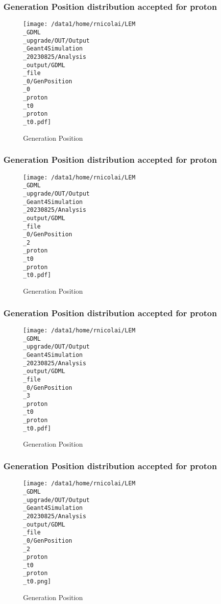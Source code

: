 \documentclass[8pt]{beamer}
\begin{document}
            \begin{frame}
                \frametitle{Generation Position distribution accepted for proton}
            
        \begin{figure}[h]
            \centering
            \texttt{[image: /data1/home/rnicolai/LEM\\\_GDML\\\_upgrade/OUT/Output\\\_Geant4Simulation\\\_20230825/Analysis\\\_output/GDML\\\_file\\\_0/GenPosition\\\_0\\\_proton\\\_t0\\\_proton\\\_t0.pdf]}
            \caption{Generation Position}
        \end{figure}
        
            \end{frame}
            
            \begin{frame}
                \frametitle{Generation Position distribution accepted for proton}
            
        \begin{figure}[h]
            \centering
            \texttt{[image: /data1/home/rnicolai/LEM\\\_GDML\\\_upgrade/OUT/Output\\\_Geant4Simulation\\\_20230825/Analysis\\\_output/GDML\\\_file\\\_0/GenPosition\\\_2\\\_proton\\\_t0\\\_proton\\\_t0.pdf]}
            \caption{Generation Position}
        \end{figure}
        
            \end{frame}
            
            \begin{frame}
                \frametitle{Generation Position distribution accepted for proton}
            
        \begin{figure}[h]
            \centering
            \texttt{[image: /data1/home/rnicolai/LEM\\\_GDML\\\_upgrade/OUT/Output\\\_Geant4Simulation\\\_20230825/Analysis\\\_output/GDML\\\_file\\\_0/GenPosition\\\_3\\\_proton\\\_t0\\\_proton\\\_t0.pdf]}
            \caption{Generation Position}
        \end{figure}
        
            \end{frame}
            
            \begin{frame}
                \frametitle{Generation Position distribution accepted for proton}
            
        \begin{figure}[h]
            \centering
            \texttt{[image: /data1/home/rnicolai/LEM\\\_GDML\\\_upgrade/OUT/Output\\\_Geant4Simulation\\\_20230825/Analysis\\\_output/GDML\\\_file\\\_0/GenPosition\\\_2\\\_proton\\\_t0\\\_proton\\\_t0.png]}
            \caption{Generation Position}
        \end{figure}
        
            \end{frame}
            
\end{document}

